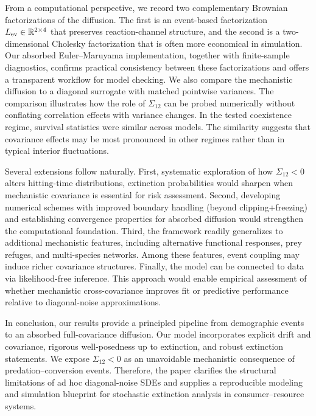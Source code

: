 \documentclass[pdflatex,sn-mathphys-ay]{sn-jnl}
\theoremstyle{thmstyleone}
\theoremstyle{definition}
\theoremstyle{remark}
\begin{document}
From a computational perspective, we record two complementary Brownian factorizations of the diffusion. The first is an event-based factorization $L_{\rm ev}\in\mathbb{R}^{2\times 4}$ that preserves reaction-channel structure, and the second is a two-dimensional Cholesky factorization that is often more economical in simulation. Our absorbed Euler–Maruyama implementation, together with finite-sample diagnostics, confirms practical consistency between these factorizations and offers a transparent workflow for model checking. We also compare the mechanistic diffusion to a diagonal surrogate with matched pointwise variances. The comparison illustrates how the role of $\Sigma_{12}$ can be probed numerically without conflating correlation effects with variance changes. 
In the tested coexistence regime, survival statistics were similar across models. The similarity suggests that covariance effects may be most pronounced in other regimes rather than in typical interior fluctuations.

Several extensions follow naturally. 
First, systematic exploration of how $\Sigma_{12}<0$ alters hitting-time distributions, extinction probabilities would sharpen when mechanistic covariance is essential for risk assessment. Second, developing numerical schemes with improved boundary handling (beyond clipping+freezing) and establishing convergence properties for absorbed diffusion would strengthen the computational foundation. 
Third, the framework readily generalizes to additional mechanistic features, including alternative functional responses, prey refuges, and multi-species networks. Among these features, event coupling may induce richer covariance structures. 
Finally, the model can be connected to data via likelihood-free inference. This approach would enable empirical assessment of whether mechanistic cross-covariance improves fit or predictive performance relative to diagonal-noise approximations.

In conclusion, our results provide a principled pipeline from demographic events to an absorbed full-covariance diffusion. Our model incorporates explicit drift and covariance, rigorous well-posedness up to extinction, and robust extinction statements.
We expose $\Sigma_{12}<0$ as an unavoidable mechanistic consequence of predation–conversion events. Therefore, the paper clarifies the structural limitations of ad hoc diagonal-noise SDEs and supplies a reproducible modeling and simulation blueprint for stochastic extinction analysis in consumer–resource systems.
\end{document}

